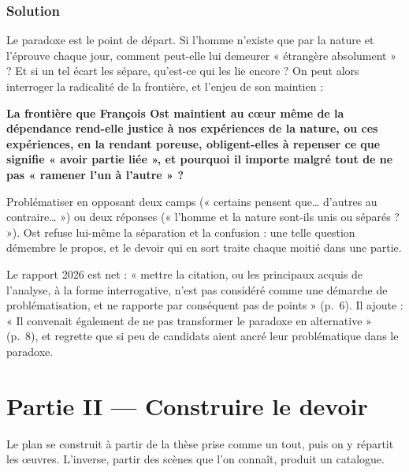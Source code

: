 \documentclass[11pt,a4paper]{article}
\begin{document}
\hypertarget{solution-2}{%
\subsubsection{Solution}\label{solution-2}}

Le paradoxe est le point de départ. Si l'homme n'existe que par la nature et l'éprouve chaque jour, comment peut-elle lui demeurer « étrangère absolument » ? Et si un tel écart les sépare, qu'est-ce qui les lie encore ? On peut alors interroger la radicalité de la frontière, et l'enjeu de son maintien :

\textbf{La frontière que François Ost maintient au cœur même de la dépendance rend-elle justice à nos expériences de la nature, ou ces expériences, en la rendant poreuse, obligent-elles à repenser ce que signifie « avoir partie liée », et pourquoi il importe malgré tout de ne pas « ramener l'un à l'autre » ?}

\begin{piege}

Problématiser en opposant deux camps (« certains pensent que\ldots{} d'autres au contraire\ldots{} ») ou deux réponses (« l'homme et la nature sont-ils unis ou séparés ? »). Ost refuse lui-même la séparation et la confusion : une telle question démembre le propos, et le devoir qui en sort traite chaque moitié dans une partie.

\end{piege}

\begin{jury}

Le rapport 2026 est net : « mettre la citation, ou les principaux acquis de l'analyse, à la forme interrogative, n'est pas considéré comme une démarche de problématisation, et ne rapporte par conséquent pas de points » (p.~6). Il ajoute : « Il convenait également de ne pas transformer le paradoxe en alternative » (p.~8), et regrette que si peu de candidats aient ancré leur problématique dans le paradoxe.

\end{jury}

\hypertarget{partie-ii-construire-le-devoir}{%
\section{Partie II --- Construire le devoir}\label{partie-ii-construire-le-devoir}}

Le plan se construit à partir de la thèse prise comme un tout, puis on y répartit les œuvres. L'inverse, partir des scènes que l'on connaît, produit un catalogue.
\end{document}

